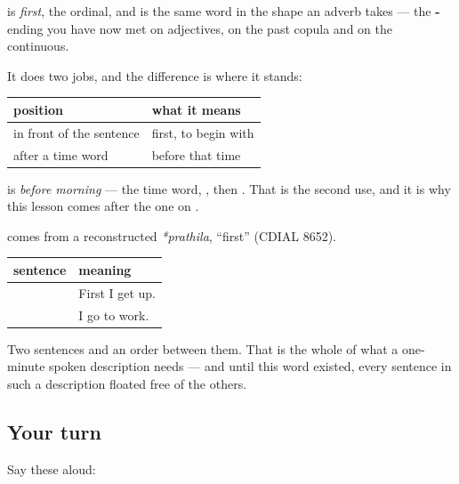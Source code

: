 \begin{cousinweb}
\textbf{} is \emph{first}, the ordinal, and \textbf{} is the same word in the shape an adverb takes — the \textbf{-} ending you have now met on adjectives, on the past copula and on the continuous.

It does two jobs, and the difference is where it stands:

\noindent
\begin{tabularx}{\linewidth}{@{}>{\raggedright\arraybackslash}X>{\raggedright\arraybackslash}X@{}}
\toprule
\textbf{position} & \textbf{what it means} \\
\midrule
in front of the sentence & first, to begin with \\
after a time word & before that time \\
\bottomrule
\end{tabularx}

\emph{  } is \emph{before morning} — the time word, \textbf{}, then \textbf{}. That is the second use, and it is why this lesson comes after the one on \textbf{}.

\textbf{} comes from a reconstructed \emph{*prathila}, \textquotedblleft{}first\textquotedblright{} (CDIAL 8652).
\end{cousinweb}

\begin{grammarlens}[title={Grammar Lens: sequencing a day}]
\noindent
\begin{tabularx}{\linewidth}{@{}>{\raggedright\arraybackslash}X>{\raggedright\arraybackslash}X@{}}
\toprule
\textbf{sentence} & \textbf{meaning} \\
\midrule
\hi{पहले} \hi{मैं} \hi{उठता} \hi{हूँ।} & First I get up. \\
\hi{मैं} \hi{काम} \hi{पर} \hi{जाता} \hi{हूँ।} & I go to work. \\
\bottomrule
\end{tabularx}

Two sentences and an order between them. That is the whole of what a one-minute spoken description needs — and until this word existed, every sentence in such a description floated free of the others.
\end{grammarlens}

\subsection*{Your turn}
Say these aloud:

